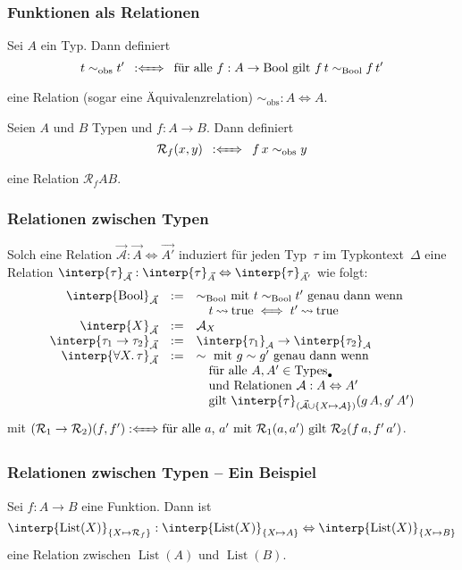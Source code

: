 \documentclass{beamer}
\newcommand{\defeq}{:=} %
\newcommand{\defiff}{:\xLeftrightarrow{\quad}} %
\newcommand{\Bool}{\text{Bool}}
\newcommand{\trueV}{\text{true}}
\newcommand{\falseV}{\text{false}}
\newcommand{\fa}[1]{\forall {#1}.\,}
\newcommand{\Types}{\text{Types}}
\newcommand{\emptyCtx}{\bullet}
\newcommand{\reducesTo}{\mathbin{\rightsquigarrow}} %
\newcommand{\obs}{\sim_\mathrm{obs}} %
\newcommand{\typeInterp}[2]{\interp{#2}_{#1}}
\newcommand{\relInterp}[2]{\interp{#2}_{#1}}
\newcommand{\Rel}[3]{#1 : #2 \Leftrightarrow #3}
\newcommand{\funRel}[1]{\mathcal{R}_{#1}}
\DeclareMathOperator{\List}{List}
\begin{document}
\begin{frame}
  \frametitle{Funktionen als Relationen}

  Sei $A$ ein Typ.
  Dann definiert
  \[
    t \obs t'
    \enspace\defiff\enspace
    \text{für alle $f : A \to \Bool$ gilt $f\,t \sim_{\Bool} f\,t'$}
  \]
  eine Relation (sogar eine Äquivalenzrelation) $\Rel{\obs}{A}{A}$.

  Seien $A$ und $B$ Typen und $f : A \to B$.
  Dann definiert
  \[
    \funRel{f}(x, y) \enspace\defiff\enspace f\,x \obs y
  \]
  eine Relation $\funRel{f}{A}{B}$.
\end{frame}

\begin{frame}
  \frametitle{Relationen zwischen Typen}
  Solch eine Relation $\Rel{\vec{\mathcal{A}}}{\vec{A}}{\vec{A'}}$ induziert für jeden Typ~$\tau$ im Typkontext~$\Delta$ eine Relation $\Rel{\relInterp{\vec{\mathcal{A}}}{\tau}}{\typeInterp{\vec{A}}{\tau}}{\typeInterp{\vec{A'}}{\tau}}$ wie folgt:
  \[
    \begin{array}{r c l}
      \relInterp{\vec{\mathcal{A}}}{\Bool} &\defeq& {\sim_\Bool} \text{ mit } t \sim_{\Bool} t' \text{ genau dann wenn} \\
      && \quad t \reducesTo \trueV \iff t' \reducesTo \trueV \\
      \relInterp{\vec{\mathcal{A}}}{X} &\defeq& \mathcal{A}_X \\
      \relInterp{\vec{\mathcal{A}}}{\tau_1 \to \tau_2} &\defeq& \relInterp{\mathcal{A}}{\tau_1} \to \relInterp{\mathcal{A}}{\tau_2} \\
      \relInterp{\vec{\mathcal{A}}}{\fa{X} \tau} &\defeq& \sim \text{ mit } g \sim g' \text{ genau dann wenn} \\
      && \quad \text{für alle $A, A' \in \Types_\emptyCtx$} \\
      && \quad \text{und Relationen $\Rel{\mathcal{A}}{A}{A'}$} \\
      && \quad \text{gilt } \relInterp{(\vec{\mathcal{A}} \cup \{X \mapsto \mathcal{A}\})}{\tau}(g\,A, g'\,A')
    \end{array}
  \]
  mit $(\mathcal{R}_1 \to \mathcal{R}_2)(f, f') \defiff \text{für alle $a$, $a'$ mit $\mathcal{R}_1(a, a')$ gilt $\mathcal{R}_2(f\,a, f'\,a')$}$.
\end{frame}

\begin{frame}
  \frametitle{Relationen zwischen Typen -- Ein Beispiel}
  Sei $f : A \to B$ eine Funktion.
  Dann ist
  \[
    \Rel{\relInterp{\{X \mapsto \funRel{f}\}}{\List(X)}}
      {\typeInterp{\{ X \mapsto A \}}{\List(X)}}
      {\typeInterp{\{ X \mapsto B \}}{\List(X)}}
  \]
  eine Relation zwischen $\List(A)$ und $\List(B)$.
\end{frame}
\end{document}
